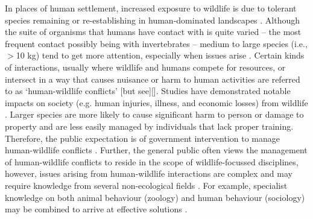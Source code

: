 In places of human settlement, increased exposure to wildlife is due to tolerant species remaining or re-establishing in human-dominated landscapes \citep{soul16}. Although the suite of organisms that humans have contact with is quite varied -- the most frequent contact possibly being with invertebrates -- medium to large species (i.e., $>$10 kg) tend to get more attention, especially when issues arise \citep{seor16}. Certain kinds of interactions, usually where wildlife and humans compete for resources, or intersect in a way that causes nuisance or harm to human activities are referred to as `human-wildlife conflicts' [but see][]\citep{pete10}. Studies have demonstrated notable impacts on society (e.g. human injuries, illness, and economic losses) from wildlife \citep{cono95}. Larger species are more likely to cause significant harm to person or damage to property \citep{cono01} and are less easily managed by individuals that lack proper training. Therefore, the public expectation is of government intervention to manage human-wildlife conflicts \citep{reit99}. Further, the general public often views the management of human-wildlife conflicts to reside in the scope of wildlife-focussed disciplines, however, issues arising from human-wildlife interactions are complex and may require knowledge from several non-ecological fields \citep{deck97,madd04}. For example, specialist knowledge on both animal behaviour (zoology) and human behaviour (sociology) may be combined to arrive at effective solutions \citep{dicka10}.



